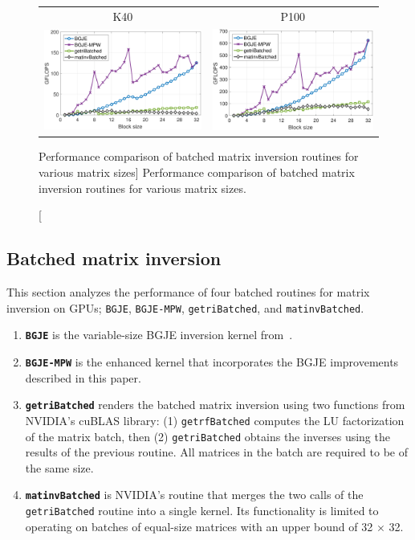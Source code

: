\begin{figure}[t]
\begin{center}
{\scriptsize
\begin{tabular}{cc}
K40 & P100\\
\includegraphics[width=.46\columnwidth]{plots/gje_bs_n_d_K40.pdf}
&
\includegraphics[width=.46\columnwidth]{plots/gje_bs_n_d_P100.pdf}
\end{tabular}
}
\end{center}
\caption
[Performance comparison of batched matrix inversion routines
for various matrix sizes]
{Performance comparison of batched matrix inversion routines
    for various matrix sizes.}
\label{2017-gje-block-jacobi:fig:bgje-mpw-fixed-batch}
\end{figure}

\subsection{Batched matrix inversion}

This section analyzes the performance of four batched routines for matrix
inversion on GPUs; {\tt BGJE}, {\tt BGJE-MPW}, {\tt getriBatched}, and {\tt matinvBatched}.
\begin{enumerate}
\item
\textbf{\tt BGJE} is the variable-size BGJE inversion kernel from~\cite{Anzt:2017:BGE:3026937.3026940}.
\item
\textbf{\tt BGJE-MPW} is the enhanced kernel that
       incorporates the BGJE improvements described in this paper.
\item
\textbf{\tt getriBatched} renders the batched matrix inversion using two
functions from NVIDIA's cuBLAS library: (1) \texttt{\tt getrfBatched} computes
the LU factorization of the matrix batch, then (2) \texttt{\tt getriBatched}
obtains the inverses using the results of the previous routine. All matrices in
the batch are required to be of the same size.
\item
\textbf{\tt matinvBatched} is NVIDIA's
routine that merges the two calls of the {\tt getriBatched} routine into
a single kernel. Its functionality is limited to operating on batches of
equal-size matrices with an upper bound of 32 $\times$ 32.
\end{enumerate}

